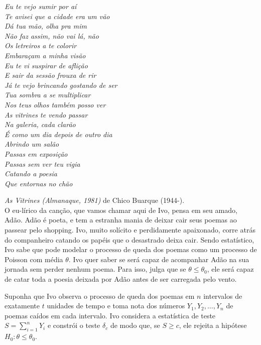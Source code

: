 \documentclass[a4paper,10pt, notitlepage]{report}
\begin{document}
        \begin{center}\textit{
        Eu te vejo sumir por aí\\
        Te avisei que a cidade era um vão\\
        Dá tua mão, olha pra mim\\
        Não faz assim, não vai lá, não\\
        Os letreiros a te colorir\\
        Embaraçam a minha visão\\
        Eu te vi suspirar de aflição\\
        E sair da sessão frouxa de rir\\
        Já te vejo brincando gostando de ser\\
        Tua sombra a se multiplicar\\
        Nos teus olhos também posso ver\\
        As vitrines te vendo passar\\
        Na galeria, cada clarão\\
        É como um dia depois de outro dia\\
        Abrindo um salão\\
        Passas em exposição\\
        Passas sem ver teu vigia\\
        Catando a poesia\\
        Que entornas no chão\\
        }
        \end{center}
        \textit{As Vitrines (Almanaque, 1981)} de Chico Buarque (1944-).\\            
        
O eu-lírico da canção, que vamos chamar aqui de Ivo, pensa em seu amado, Adão.
Adão é poeta, e tem a estranha mania de deixar cair seus poemas ao passear pelo shopping.
Ivo, muito solícito e perdidamente apaixonado, corre atrás do companheiro catando os papéis que
o desastrado deixa cair.
Sendo estatístico, Ivo sabe que pode modelar o processo de queda dos poemas como um processo de Poisson com média $\theta$.
Ivo quer saber se será capaz de acompanhar Adão na sua jornada sem perder nenhum poema.
Para isso, julga que se $\theta \leq \theta_0$, ele será capaz de catar toda a poesia deixada por Adão antes de ser carregada pelo vento.

Suponha que Ivo observa o processo de queda dos poemas em $n$ intervalos de exatamente $t$ unidades de tempo e toma nota dos números $Y_1, Y_2, \ldots, Y_n$ de poemas caídos em cada intervalo.
Ivo considera a estatística de teste $S = \sum_{i=1}^n Y_i$ e constrói o teste $\delta_c$ de modo que, se $S \geq c$, ele rejeita a hipótese $H_0: \theta \leq \theta_0$.
\end{document}
